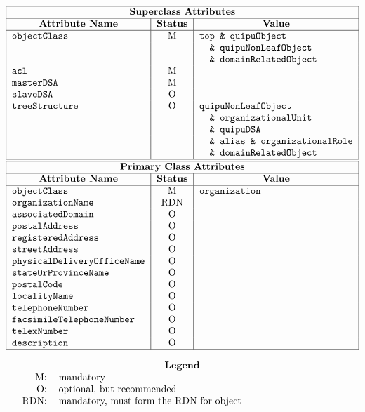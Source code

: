 
\smaller

\[\begin{tabular}{|l|c|l|}
\hline
\multicolumn{3}{|c|}{\bf Superclass Attributes}\\
\hline
\multicolumn{1}{|c|}{\bf Attribute Name}&
			\multicolumn{1}{c|}{\bf Status}&
				\multicolumn{1}{c|}{\bf Value}\\
\hline
\verb"objectClass"&	M&	\verb"top & quipuObject"\\
&			&	\verb"  & quipuNonLeafObject"\\
&			&	\verb"  & domainRelatedObject"\\
\verb"acl"&		M&	\\
\verb"masterDSA"&	M&	\\
\verb"slaveDSA"&	O&	\\
\verb"treeStructure"&	O&	\verb"quipuNonLeafObject"\\
&			&	\verb"  & organizationalUnit"\\
&			&	\verb"  & quipuDSA"\\
&			&	\verb"  & alias & organizationalRole"\\
&			&	\verb"  & domainRelatedObject"\\
\hline
\hline
\multicolumn{3}{|c|}{\bf Primary Class Attributes}\\
\hline
\multicolumn{1}{|c|}{\bf Attribute Name}&
			\multicolumn{1}{c|}{\bf Status}&
				\multicolumn{1}{c|}{\bf Value}\\
\hline
\verb"objectClass"&	M&	\verb"organization"\\
\verb"organizationName"&
			RDN&	\\
\verb"associatedDomain"&
			O&	\\
\verb"postalAddress"&	O&	\\
\verb"registeredAddress"&
			O&	\\
\verb"streetAddress"&	O&	\\
\verb"physicalDeliveryOfficeName"&
			O&	\\
\verb"stateOrProvinceName"&
			O&	\\
\verb"postalCode"&	O&	\\
\verb"localityName"&	O&	\\
\verb"telephoneNumber"&	O&	\\
\verb"facsimileTelephoneNumber"&
			O&	\\
\verb"telexNumber"&	O&	\\
\verb"description"&	O&	\\
\hline
\end{tabular}\]

\[\begin{tabular}{rp{4in}}
\multicolumn{2}{c}{\bf Legend}\\
M:&	mandatory\\
O:&	optional, but recommended\\
RDN:&	mandatory, must form the RDN for object
\end{tabular}\]

